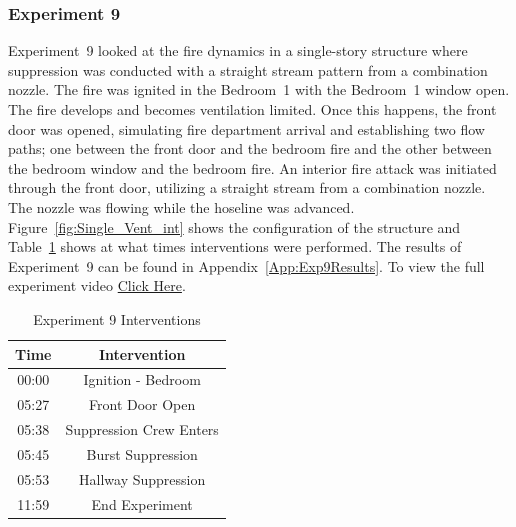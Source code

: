 \documentclass[12pt,oneside]{book}
\begin{document}
\subsubsection{Experiment 9}
Experiment~9 looked at the fire dynamics in a single-story structure where suppression was conducted with a straight stream pattern from a combination nozzle. The fire was ignited in the Bedroom~1 with the Bedroom~1 window open. The fire develops and becomes ventilation limited. Once this happens, the front door was opened, simulating fire department arrival and establishing two flow paths; one between the front door and the bedroom fire and the other between the bedroom window and the bedroom fire. An interior fire attack was initiated through the front door, utilizing a straight stream from a combination nozzle. The nozzle was flowing while the hoseline was advanced. Figure~\ref{fig:Single_Vent_int} shows the configuration of the structure and Table~\ref{Table:Exp9Interventions} shows at what times interventions were performed. The results of Experiment~9 can be found in Appendix~\ref{App:Exp9Results}. To view the full experiment video \href{https://player.vimeo.com/video/170510938?autoplay=1}{Click Here}.

\begin{table}[H]
	\centering
	\caption{Experiment 9 Interventions}
	\begin{tabular}{|c|c|} 
		\hline
		Time & Intervention \\ \hline \hline
		00:00 & Ignition - Bedroom \\ \hline
		05:27 & Front Door Open \\ \hline
		05:38 & Suppression Crew Enters\\ \hline
		05:45 & Burst Suppression \\ \hline 
		05:53 & Hallway Suppression \\ \hline
		11:59 & End Experiment\\ \hline
	\end{tabular}
	\label{Table:Exp9Interventions}
\end{table}

\FloatBarrier
\end{document}
